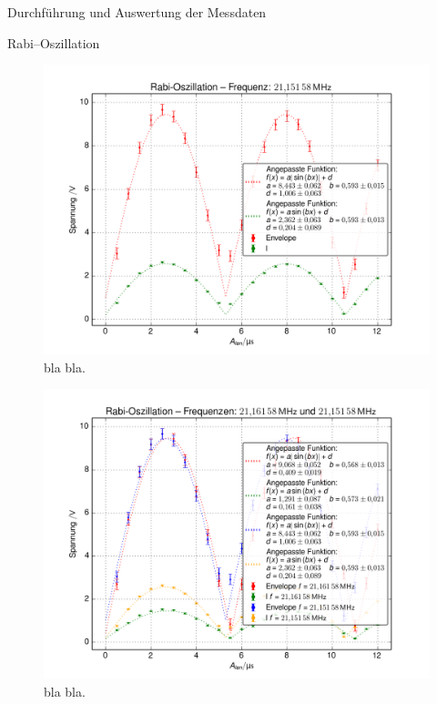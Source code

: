 \documentclass[pdftex, a4paper,11pt, twoside, ngerman]{report}
\begin{document}
\begin{chapter}{Durchführung und Auswertung der Messdaten}
\begin{section}{Rabi--Oszillation}
      \begin{figure}[htb]
        \centering
        \includegraphics[width=\textwidth]{Figures/Rabi_freq2.png}
        \caption{bla bla.}
        \label{figRabifreq2}
      \end{figure}
      
      \begin{figure}[htb]
        \centering
        \includegraphics[width=\textwidth]{Figures/Rabi_freq12.png}
        \caption{bla bla.}
        \label{figRabifreq12}
      \end{figure}
      
    \end{section}
    

\end{chapter}
\end{document}
